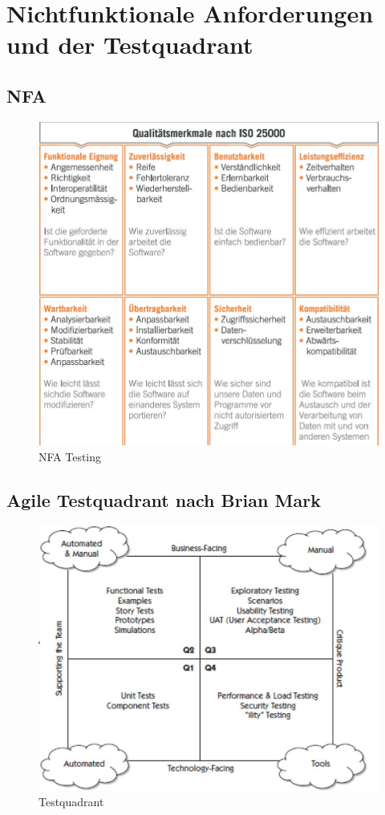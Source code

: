 \section{Nichtfunktionale Anforderungen und der Testquadrant}

\subsection{NFA}

\begin{figure}[h!]
\centering
\includegraphics[width=0.7\linewidth]{fig/nfa-testing}
\caption{NFA Testing}
\label{fig:nfa-testing}
\end{figure}

\subsection{Agile Testquadrant nach Brian Mark}

\begin{figure}[h!]
\centering
\includegraphics[width=0.5\linewidth]{fig/testquadrant}
\caption{Testquadrant}
\label{fig:testquadrant}
\end{figure}

